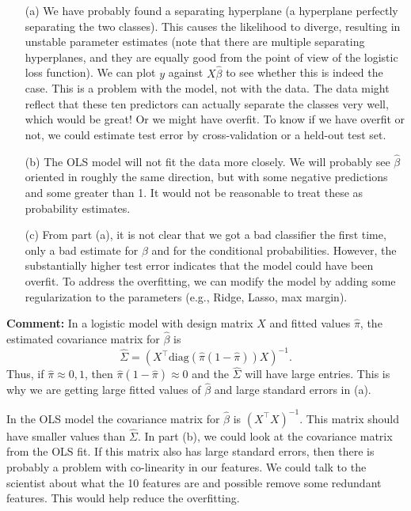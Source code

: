 \begin{enumerate}
\item[(a)] We have probably found a separating hyperplane (a hyperplane perfectly separating the two classes). This causes the likelihood to diverge, resulting in unstable parameter estimates (note that there are multiple separating hyperplanes, and they are equally good from the point of view of the logistic loss function). We can plot $y$ against $X \hat\beta$ to see whether this is indeed the case. This is a problem with the model, not with the data.  The data might reflect that these ten predictors can actually separate the classes very well, which would be great! Or we might have overfit. To know if we have overfit or not, we could estimate test error by cross-validation or a held-out test set. 


\item[(b)] The OLS model will not fit the data more closely. We will probably see $\hat\beta$ oriented in roughly the same direction, but with some negative predictions and some greater than 1. It would not be reasonable to treat these as probability estimates.

\item[(c)] From part (a), it is not clear that we got a bad classifier the first time, only a bad estimate for $\beta$ and for the conditional probabilities.  However, the substantially higher test error indicates that the model could have been overfit. To address the overfitting, we can modify the model by adding some regularization to the parameters (e.g., Ridge,  Lasso, max margin).

\end{enumerate}
{\bf Comment:} In a logistic model with design matrix $X$ and fitted values $\hat{\pi}$, the estimated covariance matrix for $\hat{\beta}$ is 
\[\hat{\Sigma} = (X^\top \mathrm{diag}(\hat{\pi}(1-\hat{\pi}))X)^{-1}. \]
Thus, if $\hat{\pi}\approx 0,1$, then $\hat{\pi}(1-\hat{\pi}) \approx 0$ and the $\hat{\Sigma}$ will have large entries. This is why we are getting large fitted values of $\hat{\beta}$ and large standard errors in (a). 

In the OLS model the covariance matrix for $\hat{\beta}$ is $(X^\top X)^{-1}$. This matrix should have smaller values than $\hat{\Sigma}$. In part (b), we could look at the covariance matrix from the OLS fit. If this matrix also has large standard errors, then there is probably a problem with co-linearity in our features. We could talk to the scientist about what the 10 features are and possible remove some redundant features. This would help reduce the overfitting. 

